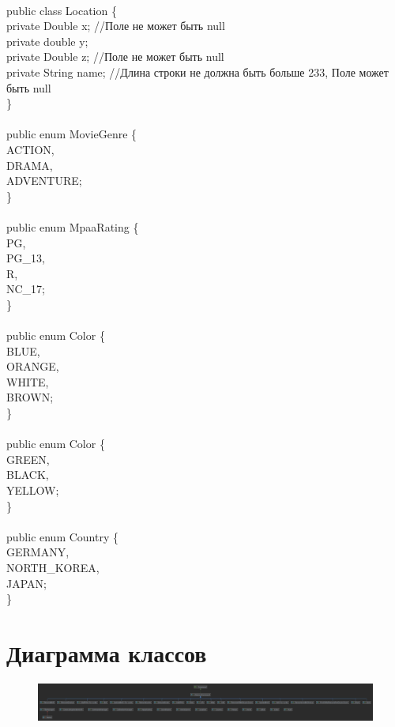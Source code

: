 {    \\
    public class Location \{ \\
    private Double x; //Поле не может быть null\\
    private double y;\\
    private Double z; //Поле не может быть null\\
    private String name; //Длина строки не должна быть больше 233, Поле может быть null\\
    \} \\
    \\
    public enum MovieGenre \{ \\
    ACTION,\\
    DRAMA,\\
    ADVENTURE;\\
    \} \\
    \\
    public enum MpaaRating \{ \\
    PG,\\
    PG\_13,\\
    R,\\
    NC\_17;\\
    \} \\
    \\
    public enum Color \{ \\
    BLUE,\\
    ORANGE,\\
    WHITE,\\
    BROWN;\\
    \} \\
    \\
    public enum Color \{ \\
    GREEN,\\
    BLACK,\\
    YELLOW;\\
    \} \\
    \\
    public enum Country \{ \\
    GERMANY,\\
    NORTH\_KOREA,\\
    JAPAN;\\
    \} \\
}
\newpage


\section{Диаграмма классов}

\begin{figure}[H]
    \includegraphics[scale=0.07]{img/diagram}
\end{figure}